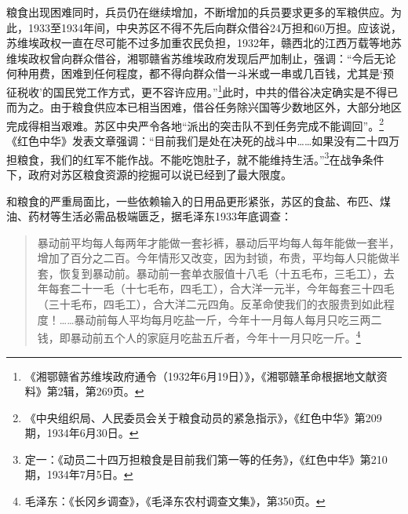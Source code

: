粮食出现困难同时，兵员仍在继续增加，不断增加的兵员要求更多的军粮供应。为此，1933至1934年间，中央苏区不得不先后向群众借谷24万担和60万担。应该说，苏维埃政权一直在尽可能不过多加重农民负担，1932年，赣西北的江西万载等地苏维埃政权曾向群众借谷，湘鄂赣省苏维埃政府发现后严加制止，强调：“今后无论何种用费，困难到任何程度，都不得向群众借一斗米或一串或几百钱，尤其是‘预征税收’的国民党工作方式，更不容许应用。”\footnote{《湘鄂赣省苏维埃政府通令（1932年6月19日）》，《湘鄂赣革命根据地文献资料》第2辑，第269页。}此时，中共的借谷决定确实是不得已而为之。由于粮食供应本已相当困难，借谷任务除兴国等少数地区外，大部分地区完成得相当艰难。苏区中央严令各地“派出的突击队不到任务完成不能调回”。\footnote{《中央组织局、人民委员会关于粮食动员的紧急指示》，《红色中华》第209期，1934年6月30日。}《红色中华》发表文章强调：“目前我们是处在决死的战斗中……如果没有二十四万担粮食，我们的红军不能作战。不能吃饱肚子，就不能维持生活。”\footnote{定一：《动员二十四万担粮食是目前我们第一等的任务》，《红色中华》第210期，1934年7月5日。}在战争条件下，政府对苏区粮食资源的挖掘可以说已经到了最大限度。


和粮食的严重局面比，一些依赖输入的日用品更形紧张，苏区的食盐、布匹、煤油、药材等生活必需品极端匮乏，据毛泽东1933年底调查：

\begin{quote}

暴动前平均每人每两年才能做一套衫裤，暴动后平均每人每年能做一套半，增加了百分之二百。今年情形又改变，因为封锁，布贵，平均每人只能做半套，恢复到暴动前。暴动前一套单衣服值十八毛（十五毛布，三毛工），去年每套二十一毛（十七毛布，四毛工），合大洋一元半，今年每套三十四毛（三十毛布，四毛工），合大洋二元四角。反革命使我们的衣服贵到如此程度！……暴动前每人平均每月吃盐一斤，今年十一月每人每月只吃三两二钱，即暴动前五个人的家庭月吃盐五斤者，今年十一月只吃一斤。\footnote{毛泽东：《长冈乡调查》，《毛泽东农村调查文集》，第350页。}
\end{quote}


